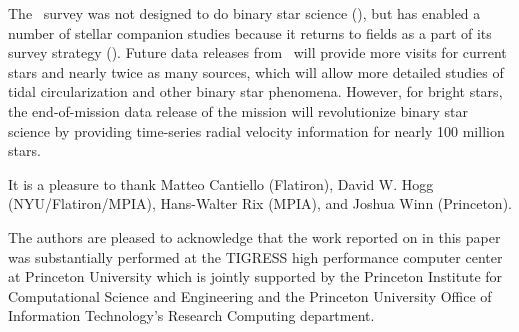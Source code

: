 \documentclass[modern, letterpaper]{aastex62}
\newcommand{\apogee}{\project{\acronym{APOGEE}}}
\newcommand{\sdssiv}{\project{\acronym{SDSS-IV}}}
\begin{document}
The \apogee\ survey was not designed to do binary star science
(\citealt{Majewski:2017}), but has enabled a number of stellar companion studies
because it returns to fields as a part of its survey strategy
(\citealt{Troup:2016, Badenes:2018, Price-Whelan:2018}).
Future data releases from \apogee\ will provide more visits for current stars
and nearly twice as many sources, which will allow more detailed studies of
tidal circularization and other binary star phenomena.
However, for bright stars, the end-of-mission data release of the 
mission will revolutionize binary star science by providing time-series radial
velocity information for nearly 100 million stars.

\acknowledgements

It is a pleasure to thank
Matteo Cantiello (Flatiron),
David W. Hogg (NYU/Flatiron/MPIA),
Hans-Walter Rix (MPIA),
and Joshua Winn (Princeton).

The authors are pleased to acknowledge that the work reported on in this
paper was substantially performed at the TIGRESS high performance computer
center at Princeton University which is jointly supported by the Princeton
Institute for Computational Science and Engineering and the Princeton
University Office of Information Technology's Research Computing department.


\facility{\sdssiv, \apogee}



\end{document}
